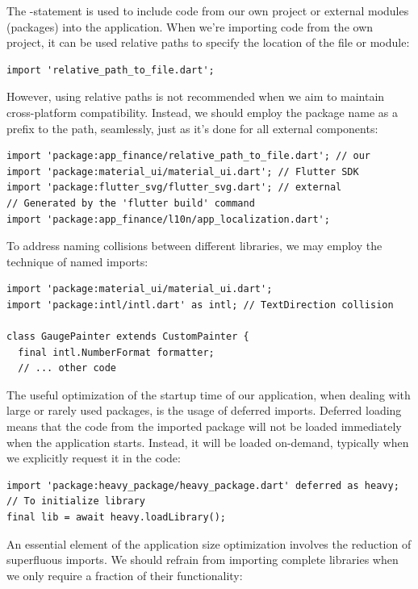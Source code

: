 The -statement is used to include code from our own project or external modules (packages) into the
application. When we're importing code from the own project, it can be used relative paths to specify the location of
the file or module:

\begin{lstlisting}
import 'relative_path_to_file.dart';
\end{lstlisting}

\noindent However, using relative paths is not recommended when we aim to maintain cross-platform compatibility.
Instead, we should employ the package name as a prefix to the path, seamlessly, just as it's done for all external
components:

\begin{lstlisting}
import 'package:app_finance/relative_path_to_file.dart'; // our
import 'package:material_ui/material_ui.dart'; // Flutter SDK
import 'package:flutter_svg/flutter_svg.dart'; // external
// Generated by the 'flutter build' command
import 'package:app_finance/l10n/app_localization.dart';
\end{lstlisting}

\noindent To address naming collisions between different libraries, we may employ the technique of named imports:

\begin{lstlisting}
import 'package:material_ui/material_ui.dart';
import 'package:intl/intl.dart' as intl; // TextDirection collision

class GaugePainter extends CustomPainter {
  final intl.NumberFormat formatter;
  // ... other code
\end{lstlisting}

\noindent The useful optimization of the startup time of our application, when dealing with large or rarely used
packages, is the usage of deferred imports. Deferred loading means that the code from the imported package will not be
loaded immediately when the application starts. Instead, it will be loaded on-demand, typically when we explicitly
request it in the code:

\begin{lstlisting}
import 'package:heavy_package/heavy_package.dart' deferred as heavy;
// To initialize library
final lib = await heavy.loadLibrary();
\end{lstlisting}

\noindent An essential element of the application size optimization involves the reduction of superfluous imports.
We should refrain from importing complete libraries when we only require a fraction of their functionality:

